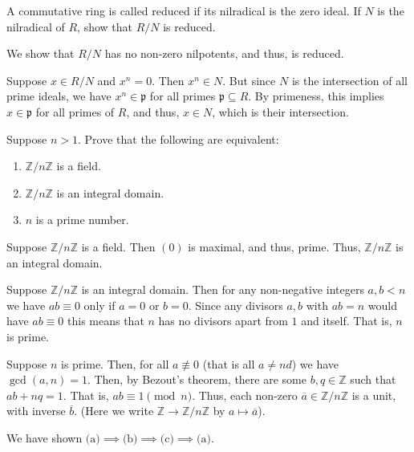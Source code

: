\documentclass[12 pt, letterpaper]{hmcpset}
\begin{document}
\pagebreak

\begin{problem}[4.]
	A commutative ring is called reduced if its nilradical is the zero ideal. If $N$ is the nilradical of $R$, show that $R / N$ is reduced.
\end{problem}

\begin{solution}
	We show that $R / N$ has no non-zero nilpotents, and thus, is reduced.

	Suppose $x \in R / N$ and $x^{n} = 0$. Then $x^{n} \in N$. But since $N$ is the intersection of all prime ideals, we have $x^{n} \in \mathfrak{p}$ for all primes $\mathfrak{p} \subseteq R$. By primeness, this implies $x \in \mathfrak{p}$ for all primes of $R$, and thus, $x \in N$, which is their intersection.
\end{solution}

\pagebreak

\begin{problem}[5.]
	Suppose $n > 1$. Prove that the following are equivalent:
	\begin{enumerate}
		\item $\mathbb{Z} / n \mathbb{Z}$ is a field.
		\item $\mathbb{Z} / n \mathbb{Z}$ is an integral domain.
		\item $n$ is a prime number.
	\end{enumerate}
\end{problem}

\begin{solution}
	Suppose $\mathbb{Z} / n \mathbb{Z}$ is a field. Then $(0)$ is maximal, and thus, prime. Thus, $\mathbb{Z} / n \mathbb{Z}$ is an integral domain.

	Suppose $\mathbb{Z} / n \mathbb{Z}$ is an integral domain. Then for any non-negative integers $a, b < n$ we have $ab \equiv 0$ only if $a = 0$ or $b = 0$. Since any divisors $a, b$ with $ab = n$ would have $ab \equiv 0$ this means that $n$ has no divisors apart from $1$ and itself. That is, $n$ is prime.

	Suppose $n$ is prime. Then, for all $a \not \equiv 0$ (that is all $a \neq n d$) we have $\gcd(a, n) = 1$. Then, by Bezout's theorem, there are some $b, q \in \mathbb{Z}$ such that $ab + nq = 1$. That is, $ab \equiv 1 \pmod{n}$. Thus, each non-zero $\overline{a} \in \mathbb{Z} / n \mathbb{Z}$ is a unit, with inverse $\overline{b}$. (Here we write $\mathbb{Z} \to \mathbb{Z} / n \mathbb{Z}$ by $a \mapsto \overline{a}$).

	We have shown $\text{(a)} \implies \text{(b)} \implies \text{(c)} \implies \text{(a)}$.
\end{solution}
\end{document}
